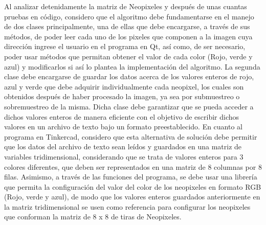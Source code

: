\documentclass{article}
\begin{document}
Al analizar detenidamente la matriz de Neopixeles y después de unas cuantas pruebas en código, considero que el algoritmo debe fundamentarse en el manejo de dos clases principalmente, una de ellas que debe encargarse, a través de sus métodos, de poder leer cada uno de los pixeles que componen a la imagen cuya dirección ingrese el usuario en el programa en Qt, así como, de ser necesario, poder usar métodos que permitan obtener el valor de cada color (Rojo, verde y azul) y modificarlos si así lo plantea la implementación del algoritmo. La segunda clase debe encargarse de guardar los datos acerca de los valores enteros de rojo, azul y verde que debe adquirir individualmente cada neopixel, los cuales son obtenidos después de haber procesado la imagen, ya sea por submuestreo o sobremuestreo de la misma. Dicha clase debe garantizar que se pueda acceder a dichos valores enteros de manera eficiente con el objetivo de escribir dichos valores en un archivo de texto bajo un formato preestablecido. En cuanto al programa en Tinkercad, considero que esta alternativa de solución debe permitir que los datos del archivo de texto sean leídos y guardados en una matriz de variables tridimensional, considerando que se trata de valores enteros para 3 colores diferentes, que deben ser representados en una matriz de 8 columnas por 8 filas. Asimismo, a través de las funciones del programa, se debe usar una librería que permita la configuración del valor del color de los neopixeles en formato RGB (Rojo, verde y azul), de modo que los valores enteros guardados anteriormente en la matriz tridimensional se usen como referencia para configurar los neopixeles que conforman la matriz de 8 x 8 de tiras de Neopixeles.
\end{document}
